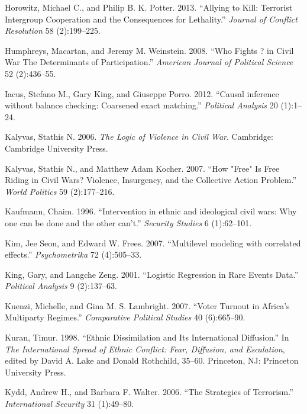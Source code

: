 \documentclass[12pt,]{book}
\theoremstyle{definition}
\theoremstyle{definition}
\theoremstyle{definition}
\theoremstyle{remark}
\begin{document}
\leavevmode\hypertarget{ref-Horowitz2013}{}%
Horowitz, Michael C., and Philip B. K. Potter. 2013. ``Allying to Kill:
Terrorist Intergroup Cooperation and the Consequences for Lethality.''
\emph{Journal of Conflict Resolution} 58 (2):199--225.

\leavevmode\hypertarget{ref-Humphreys2008}{}%
Humphreys, Macartan, and Jeremy M. Weinstein. 2008. ``Who Fights ? in
Civil War The Determinants of Participation.'' \emph{American Journal of
Political Science} 52 (2):436--55.

\leavevmode\hypertarget{ref-Iacus2012}{}%
Iacus, Stefano M., Gary King, and Giuseppe Porro. 2012. ``Causal
inference without balance checking: Coarsened exact matching.''
\emph{Political Analysis} 20 (1):1--24.

\leavevmode\hypertarget{ref-Kalyvas2006}{}%
Kalyvas, Stathis N. 2006. \emph{The Logic of Violence in Civil War}.
Cambridge: Cambridge University Press.

\leavevmode\hypertarget{ref-Kalyvas2007}{}%
Kalyvas, Stathis N., and Matthew Adam Kocher. 2007. ``How "Free" Is Free
Riding in Civil Wars? Violence, Insurgency, and the Collective Action
Problem.'' \emph{World Politics} 59 (2):177--216.

\leavevmode\hypertarget{ref-Kaufmann1996}{}%
Kaufmann, Chaim. 1996. ``Intervention in ethnic and ideological civil
wars: Why one can be done and the other can't.'' \emph{Security Studies}
6 (1):62--101.

\leavevmode\hypertarget{ref-Kim2007}{}%
Kim, Jee Seon, and Edward W. Frees. 2007. ``Multilevel modeling with
correlated effects.'' \emph{Psychometrika} 72 (4):505--33.

\leavevmode\hypertarget{ref-King2001a}{}%
King, Gary, and Langche Zeng. 2001. ``Logistic Regression in Rare Events
Data.'' \emph{Political Analysis} 9 (2):137--63.

\leavevmode\hypertarget{ref-Kuenzi2007}{}%
Kuenzi, Michelle, and Gina M. S. Lambright. 2007. ``Voter Turnout in
Africa's Multiparty Regimes.'' \emph{Comparative Political Studies} 40
(6):665--90.

\leavevmode\hypertarget{ref-Kuran1998}{}%
Kuran, Timur. 1998. ``Ethnic Dissimilation and Its International
Diffusion.'' In \emph{The International Spread of Ethnic Conflict: Fear,
Diffusion, and Escalation}, edited by David A. Lake and Donald
Rothchild, 35--60. Princeton, NJ: Princeton University Press.

\leavevmode\hypertarget{ref-Kydd2006}{}%
Kydd, Andrew H., and Barbara F. Walter. 2006. ``The Strategies of
Terrorism.'' \emph{International Security} 31 (1):49--80.
\end{document}
